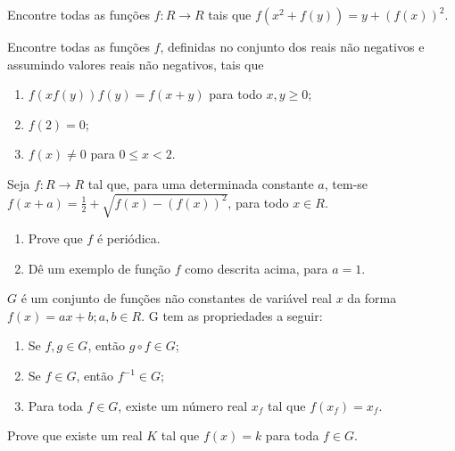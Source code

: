 \begin{questao}
  Encontre todas as funções $f: R \rightarrow R$ tais que $f(x^2+f(y)) =
  y+(f(x))^2$.
\end{questao}

\begin{questao}
  Encontre todas as funções $f$, definidas no conjunto dos reais não negativos e
  assumindo valores reais não negativos, tais que

  \begin{enumerate}

  \item $f(xf(y))f(y)=f(x+y)$ para todo $x,y \geq 0$;

  \item $f(2)=0$;

  \item $f(x)\not=0$ para $0 \leq x < 2$.
  \end{enumerate}

\end{questao}

\begin{questao}
  Seja $f: R \rightarrow R$ tal que, para uma determinada constante $a$, tem-se
  $f(x+a) = \frac{1}{2} + \sqrt{f(x)-(f(x))^2}$, para todo $x \in R$.

  \begin{enumerate}

  \item Prove que $f$ é periódica.

  \item Dê um exemplo de função $f$ como descrita acima, para $a=1$.
  \end{enumerate}

\end{questao}

\begin{questao}
  
  $G$ é um conjunto de funções não constantes de variável real $x$ da forma
  $f(x) = ax+b; a,b \in R$. G tem as propriedades a seguir:

  \begin{enumerate}

  \item Se $f,g \in G$, então $g \circ f \in G$;

  \item Se $f \in G$, então $f^{-1} \in G$;

  \item Para toda $f \in G$, existe um número real $x_f$ tal que $f(x_f) = x_f$.
  \end{enumerate}

  Prove que existe um real $K$ tal que $f(x) = k$ para toda $f \in G$.
\end{questao}

